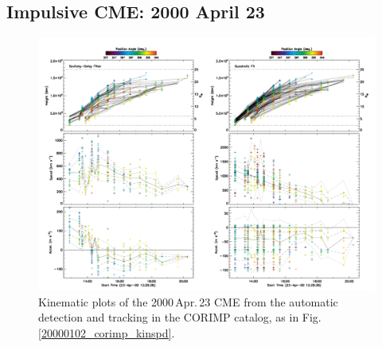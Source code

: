 \documentclass[referee,a4paper,12pt,traditabstract]{swsc}
\begin{document}
\begin{linenumbers}
\subsection{Impulsive CME: 2000 April 23}


\begin{figure}[t]
\centerline{\includegraphics[width=\linewidth]{images/20000423_corimp_kinspd.pdf}}
\caption{Kinematic plots of the 2000\,Apr.\,23 CME from the automatic detection and tracking in the CORIMP catalog, as in Fig.\,\ref{20000102_corimp_kinspd}.}
\label{20000423_corimp_kinspd}
\end{figure}



\end{linenumbers}
\end{document}
